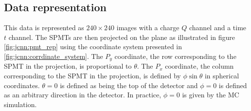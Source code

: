 \documentclass[../main.tex]{subfiles}
\begin{document}
\subsection{Data representation}
\label{sec:jcnn:data}

This data is represented as $240 \times 240$ images with a charge $Q$ channel and a time $t$ channel. The SPMTs are then projected on the plane as illustrated in figure \ref{fig:jcnn:pmt_rep} using the coordinate system presented in \ref{fig:jcnn:corrdinate_system}. The $P_y$ coordinate, the row corresponding to the SPMT in the projection, is proportional to $\theta$. The $P_x$ coordinate, the column corresponding to the SPMT in the projection, is defined by $\phi \sin{\theta}$ in spherical coordinates. $\theta = 0$ is defined as being the top of the detector and $\phi = 0$ is defined as an arbitrary direction in the detector. In practice, $\phi = 0$ is given by the MC simulation.
\end{document}
